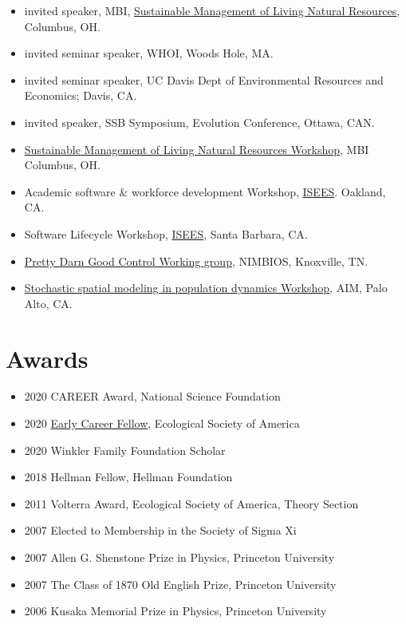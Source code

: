 \documentclass[10pt,sans]{moderncv}        %
\providecommand{\tightlist}{%
    \setlength{\itemsep}{0pt}\setlength{\parskip}{0pt}}
\begin{document}
\begin{itemize}
\tightlist
\item
  invited speaker, MBI,
  \href{http://www.mbi.ohio-state.edu/2013/ws3description.html}{Sustainable
  Management of Living Natural Resources}, Columbus, OH.
\item
  invited seminar speaker, WHOI, Woods Hole, MA.
\item
  invited seminar speaker, UC Davis Dept of Environmental Resources and
  Economics; Davis, CA.
\item
  invited speaker, SSB Symposium, Evolution Conference, Ottawa, CAN.
\item
  \href{http://www.mbi.ohio-state.edu/2013/ws3description.html}{Sustainable
  Management of Living Natural Resources Workshop}, MBI Columbus, OH.
\item
  Academic software \& workforce development Workshop,
  \href{http://isees.nceas.ucsb.edu}{ISEES}. Oakland, CA.
\item
  Software Lifecycle Workshop,
  \href{http://isees.nceas.ucsb.edu}{ISEES}, Santa Barbara, CA.
\item
  \href{http://www.nimbios.org/workinggroups/WG_PDG}{Pretty Darn Good
  Control Working group}, NIMBIOS, Knoxville, TN.
\item
  \href{http://www.aimath.org/WWN/populationmodel/}{Stochastic spatial
  modeling in population dynamics Workshop}, AIM, Palo Alto, CA.
\end{itemize}

\hypertarget{awards}{%
\section{Awards}\label{awards}}

\begin{itemize}
\tightlist
\item
  2020 CAREER Award, National Science Foundation
\item
  2020
  \href{https://www.esa.org/blog/2020/04/09/assistant-professor-carl-boettiger-named-2020-ecological-society-of-america-fellow/}{Early
  Career Fellow}, Ecological Society of America
\item
  2020 Winkler Family Foundation Scholar
\item
  2018 Hellman Fellow, Hellman Foundation
\item
  2011 Volterra Award, Ecological Society of America, Theory Section
\item
  2007 Elected to Membership in the Society of Sigma Xi
\item
  2007 Allen G. Shenstone Prize in Physics, Princeton University
\item
  2007 The Class of 1870 Old English Prize, Princeton University
\item
  2006 Kusaka Memorial Prize in Physics, Princeton University
\end{itemize}
\end{document}
